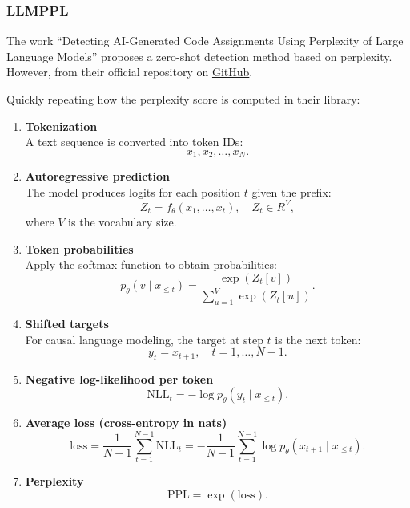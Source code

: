 \subsubsection{LLMPPL}
The work “Detecting AI-Generated Code Assignments Using Perplexity 
of Large Language Models” proposes a zero-shot detection method based 
on perplexity. However, from their official repository on 
\href{https://github.com/Arrtourz/llmppl}{GitHub}.

Quickly repeating how the perplexity score is computed in their library:
\begin{enumerate}
    \item \textbf{Tokenization} \\
    A text sequence is converted into token IDs:
    \[
        x_1, x_2, \dots, x_N.
    \]

    \item \textbf{Autoregressive prediction} \\
    The model produces logits for each position $t$ given the prefix:
    \[
        Z_t = f_\theta(x_1, \dots, x_t), \quad Z_t \in R^V,
    \]
    where $V$ is the vocabulary size.

    \item \textbf{Token probabilities} \\
    Apply the softmax function to obtain probabilities:
    \[
        p_\theta(v \mid x_{\leq t}) = \frac{\exp(Z_t[v])}{\sum_{u=1}^V \exp(Z_t[u])}.
    \]

    \item \textbf{Shifted targets} \\
    For causal language modeling, the target at step $t$ is the next token:
    \[
        y_t = x_{t+1}, \quad t = 1, \dots, N-1.
    \]

    \item \textbf{Negative log-likelihood per token} \\
    \[
        \mathrm{NLL}_t = - \log p_\theta(y_t \mid x_{\leq t}).
    \]

    \item \textbf{Average loss (cross-entropy in nats)} \\
    \[
        \mathrm{loss} = \frac{1}{N-1} \sum_{t=1}^{N-1} \mathrm{NLL}_t
        = -\frac{1}{N-1} \sum_{t=1}^{N-1} \log p_\theta(x_{t+1} \mid x_{\leq t}).
    \]

    \item \textbf{Perplexity} \\
    \[
        \mathrm{PPL} = \exp(\mathrm{loss}).
    \]
\end{enumerate}

